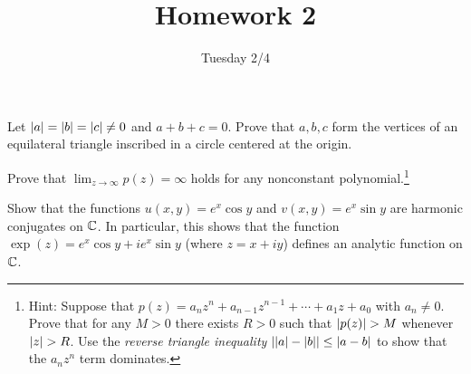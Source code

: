 \documentclass{../math135}
\title{Homework 2}
\author{}
\date{Tuesday 2/4}
\begin{document}
\begin{exercise}
	Let \(\abs a = \abs b = \abs c \ne 0\) and \(a + b + c = 0\).  Prove
  that \(a, b, c\) form the vertices of an equilateral triangle
  inscribed in a circle centered at the origin.

  \begin{solution}
  \end{solution}

\end{exercise}

\begin{exercise}
	Prove that \(\lim_{z\to \infty} p(z) = \infty\) holds for any
  nonconstant polynomial.\footnote{Hint: Suppose that
    \(p(z) = a_n z^n + a_{n-1} z^{n-1} + \cdots + a_1 z + a_0\) with
    \(a_n \ne 0\).  Prove that for any \(M >0\) there exists \(R>0\)
    such that \(\abs{p(z)} > M\) whenever \(\abs z > R\).  Use the
    \emph{reverse triangle inequality}
    \(\abs*{\abs a - \abs b} \le \abs{a-b}\) to show that the
    \(a_n z^n\) term dominates.}

  \begin{solution}
  \end{solution}

\end{exercise}

\begin{exercise}
	Show that the functions \(u(x, y) = e^x \cos y\) and
  \(v(x, y) = e^x \sin y\) are harmonic conjugates on \(\CC\).  In
  particular, this shows that the function
  \(\exp(z) = e^x\cos y + i e^x \sin y\) (where \(z=x+iy\)) defines an
  analytic function on \(\CC\).

  \begin{solution}
  \end{solution}

\end{exercise}
\end{document}
